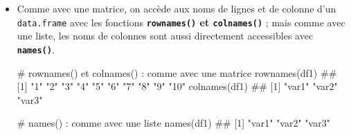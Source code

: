 \documentclass[12pt,twosided, notitlepage]{book}
\newenvironment{Shaded}{}{}
\newcommand{\KeywordTok}[1]{\textcolor[rgb]{0.00,0.00,1.00}{{#1}}}
\newcommand{\CommentTok}[1]{\textcolor[rgb]{0.00,0.50,0.00}{{#1}}}
\newcommand{\NormalTok}[1]{{#1}}
\renewenvironment{Shaded}{\begin{snugshade}}{\end{snugshade}}
\begin{document}
\begin{itemize}
\item
  Comme avec une matrice, on accède aux noms de lignes et de colonne
  d'un \texttt{data.frame} avec les fonctions
  \textbf{\texttt{rownames()} et
  \texttt{colnames()}}
  ; mais comme avec une liste, les noms de colonnes sont aussi
  directement accessibles avec
  \textbf{\texttt{names()}}.

\begin{Shaded}
\begin{Highlighting}[]
\CommentTok{# rownames() et colnames() : comme avec une matrice}
\KeywordTok{rownames}\NormalTok{(df1)}
  \NormalTok{##  [1] "1"  "2"  "3"  "4"  "5"  "6"  "7"  "8"  "9"  "10"}
\KeywordTok{colnames}\NormalTok{(df1)}
  \NormalTok{## [1] "var1" "var2" "var3"}

\CommentTok{# names() : comme avec une liste}
\KeywordTok{names}\NormalTok{(df1)}
  \NormalTok{## [1] "var1" "var2" "var3"}
\end{Highlighting}
\end{Shaded}
\end{itemize}

~
\end{document}
